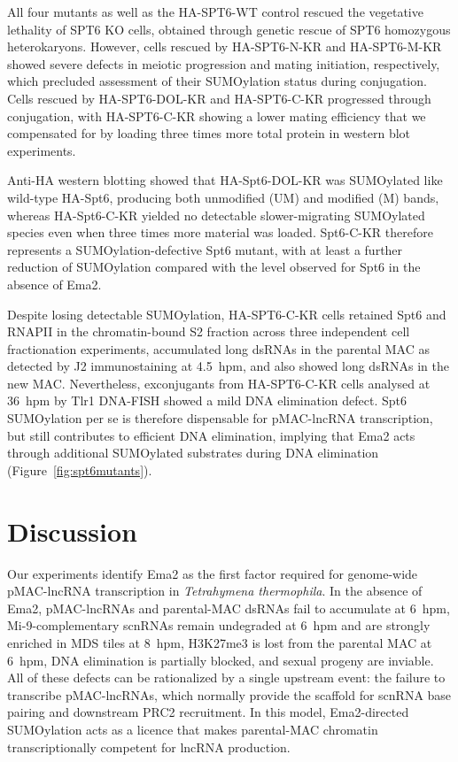 \documentclass[11pt]{article}
\begin{document}
All four mutants as well as the HA-SPT6-WT control rescued the vegetative
lethality of SPT6 KO cells, obtained through genetic rescue of SPT6
homozygous heterokaryons. However, cells rescued by HA-SPT6-N-KR and
HA-SPT6-M-KR showed severe defects in meiotic progression and mating
initiation, respectively, which precluded assessment of their SUMOylation
status during conjugation. Cells rescued by HA-SPT6-DOL-KR and
HA-SPT6-C-KR progressed through conjugation, with HA-SPT6-C-KR showing
a lower mating efficiency that we compensated for by loading three times
more total protein in western blot experiments.

Anti-HA western blotting showed that HA-Spt6-DOL-KR was SUMOylated like
wild-type HA-Spt6, producing both unmodified (UM) and modified (M) bands,
whereas HA-Spt6-C-KR yielded no detectable slower-migrating SUMOylated
species even when three times more material was loaded. Spt6-C-KR
therefore represents a SUMOylation-defective Spt6 mutant, with at least a
further reduction of SUMOylation compared with the level observed for
Spt6 in the absence of Ema2.

Despite losing detectable SUMOylation, HA-SPT6-C-KR cells retained Spt6 and
RNAPII in the chromatin-bound S2 fraction across three independent cell
fractionation experiments, accumulated long dsRNAs in the parental MAC as
detected by J2 immunostaining at 4.5~hpm, and also showed long dsRNAs in
the new MAC. Nevertheless, exconjugants from HA-SPT6-C-KR cells analysed
at 36~hpm by Tlr1 DNA-FISH showed a mild DNA elimination defect. Spt6
SUMOylation per se is therefore dispensable for pMAC-lncRNA transcription,
but still contributes to efficient DNA elimination, implying that Ema2
acts through additional SUMOylated substrates during DNA elimination
(Figure~\ref{fig:spt6mutants}).

\section{Discussion}

Our experiments identify Ema2 as the first factor required for genome-wide
pMAC-lncRNA transcription in \emph{Tetrahymena thermophila}. In the
absence of Ema2, pMAC-lncRNAs and parental-MAC dsRNAs fail to accumulate
at 6~hpm, Mi-9-complementary scnRNAs remain undegraded at 6~hpm and are
strongly enriched in MDS tiles at 8~hpm, H3K27me3 is lost from the parental
MAC at 6~hpm, DNA elimination is partially blocked, and sexual progeny are
inviable. All of these defects can be rationalized by a single upstream
event: the failure to transcribe pMAC-lncRNAs, which normally provide the
scaffold for scnRNA base pairing and downstream PRC2 recruitment. In this
model, Ema2-directed SUMOylation acts as a licence that makes parental-MAC
chromatin transcriptionally competent for lncRNA production.
\end{document}
